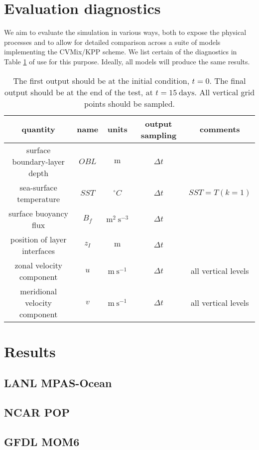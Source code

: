 \section{Evaluation diagnostics}

We aim to evaluate the simulation in various ways, both to expose the
physical processes and to allow for detailed comparison across a suite
of models implementing the CVMix/KPP scheme.  We list certain of the
diagnostics in Table \ref{table:metricsShear} of use for this purpose.
Ideally, all models will produce the same results.

\begin{table}[htdp]
\begin{center}
\begin{tabular}{|c|c|c|c|c|}
\hline
{\sc quantity}                                 & {\sc name}        & {\sc units}                              & {\sc output sampling}     & {\sc comments} \\
\hline
surface boundary-layer depth          & $OBL$              & $\mbox{m}$                            & $\Delta t$                       &  \\
\hline 
sea-surface temperature                 & $SST$               & $^{\circ}C$                                & $\Delta t$                       & $SST=T(k=1)$\\
\hline 
surface buoyancy flux                     & $B_{f}$              & $\mbox{m}^2~\mbox{s}^{-3}$   &$\Delta t$                        & \\
\hline 
position of layer interfaces              & $z_I$                & $\mbox{m}$                             & $\Delta t$ &  \\
\hline 
zonal velocity component               & $u$                   & $\mbox{m}~\mbox{s}^{-1}$       &  $\Delta t$  &  all vertical levels \\
\hline 
meridional velocity component       & $v$                    & $\mbox{m}~\mbox{s}^{-1}$       &  $\Delta t$  &  all vertical levels \\
\hline
\end{tabular}
\end{center}
\caption{The first output should be at the initial condition, $t=0$. The final 
  output should be at the end of the test, at $t=15~\mbox{days}$.  All vertical grid points should be sampled.}
\label{table:metricsShear}
\end{table}

\section{Results}
\subsection{LANL MPAS-Ocean}
\subsection{NCAR POP}
\subsection{GFDL MOM6}



